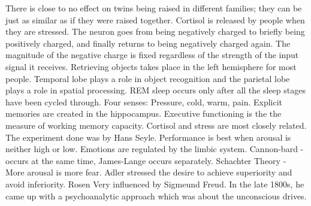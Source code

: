 \markdownRendererInterblockSeparator
{}\markdownRendererUlBeginTight
\markdownRendererUlItem There is close to no effect on twins being raised in different families; they can be just as similar as if they were raised together.\markdownRendererUlItemEnd 
\markdownRendererUlItem Cortisol is released by people when they are stressed.\markdownRendererUlItemEnd 
\markdownRendererUlItem The neuron goes from being negatively charged to briefly being positively charged, and finally returns to being negatively charged again. The magnitude of the negative charge is fixed regardless of the strength of the input signal it receives.\markdownRendererUlItemEnd 
\markdownRendererUlItem Retrieving objects takes place in the left hemisphere for most people.\markdownRendererUlItemEnd 
\markdownRendererUlItem Temporal lobe plays a role in object recognition and the parietal lobe plays a role in spatial processing.\markdownRendererUlItemEnd 
\markdownRendererUlItem REM sleep occurs only after all the sleep stages have been cycled through.\markdownRendererUlItemEnd 
\markdownRendererUlItem Four senses: Pressure, cold, warm, pain.\markdownRendererUlItemEnd 
\markdownRendererUlItem Explicit memories are created in the hippocampus.\markdownRendererUlItemEnd 
\markdownRendererUlItem Executive functioning is the the measure of working memory capacity.\markdownRendererUlItemEnd 
\markdownRendererUlItem Cortisol and stress are most closely related. The experiment done was by Hans Seyle.\markdownRendererUlItemEnd 
\markdownRendererUlItem Performance is best when arousal is neither high or low.\markdownRendererUlItemEnd 
\markdownRendererUlItem Emotions are regulated by the limbic system.\markdownRendererUlItemEnd 
\markdownRendererUlItem Cannon-bard - occurs at the same time, James-Lange occurs separately.\markdownRendererUlItemEnd 
\markdownRendererUlItem Schachter Theory - More arousal is more fear.\markdownRendererUlItemEnd 
\markdownRendererUlItem Adler stressed the desire to achieve superiority and avoid inferiority.\markdownRendererUlItemEnd 
{} Rosen\markdownRendererUlItemEnd 
\markdownRendererUlEndTight \markdownRendererInterblockSeparator
{}\markdownRendererInterblockSeparator
{}\markdownRendererInterblockSeparator
{}\markdownRendererUlBeginTight
\markdownRendererUlItem Very influenced by Sigmeund Freud.\markdownRendererUlItemEnd 
\markdownRendererUlItem In the late 1800s, he came up with a psychoanalytic approach which was about the unconscious drives.\markdownRendererUlItemEnd 
